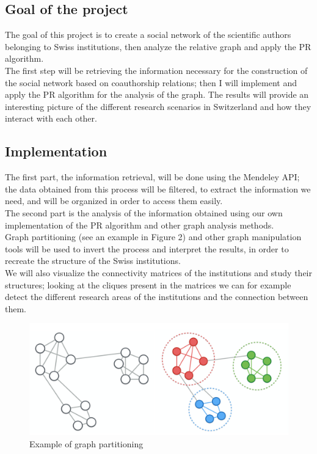 \documentclass[12 pt]{article}
\begin{document}
\subsection*{Goal of the project}
The goal of this project is to create a social network of the scientific authors belonging to Swiss institutions, then analyze the relative graph and apply the PR algorithm.\\
The first step will be retrieving the information necessary for the construction of the social network based on coauthorship relations; then I will implement and apply the PR algorithm for the analysis of the graph.
The results will provide an interesting picture of the different research scenarios in Switzerland and how they interact with each other.

\subsection*{Implementation}
The first part, the information retrieval, will be done using the Mendeley API; the data obtained from this process will be filtered, to extract the information we need, and will be organized in order to access them easily.\\
The second part is the analysis of the information obtained using our own implementation of the PR algorithm and other graph analysis methods.\\
Graph partitioning  (see an example in Figure 2) and other graph manipulation tools will be used to invert the process and interpret the results, in order to recreate the structure of the Swiss institutions. \\
We will also visualize the connectivity matrices of the institutions and study their structures; looking at the cliques present in the matrices  we can for example detect the different research areas of the institutions and the connection between them.

\begin{figure} [h!]
\centering 
\includegraphics[scale=0.2]{graphPartitioning.png}
\caption{Example of graph partitioning}
\end{figure}
\end{document}
